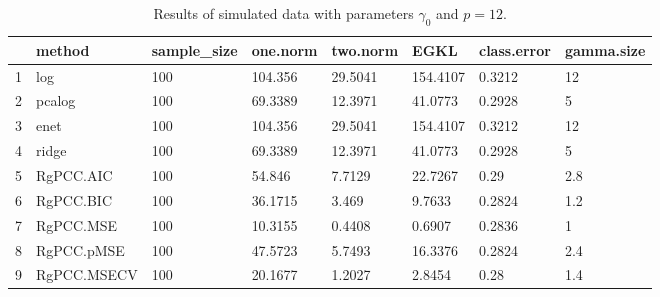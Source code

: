 \begin{table}[ht]
\centering
\begin{tabular}{rlllllll}
  \hline
 & method & sample\_size & one.norm & two.norm & EGKL & class.error & gamma.size \\ 
  \hline
1 & log & 100 & 104.356 & 29.5041 & 154.4107 & 0.3212 & 12 \\ 
  2 & pcalog & 100 & 69.3389 & 12.3971 & 41.0773 & 0.2928 & 5 \\ 
  3 & enet & 100 & 104.356 & 29.5041 & 154.4107 & 0.3212 & 12 \\ 
  4 & ridge & 100 & 69.3389 & 12.3971 & 41.0773 & 0.2928 & 5 \\ 
  5 & RgPCC.AIC & 100 & 54.846 & 7.7129 & 22.7267 & 0.29 & 2.8 \\ 
  6 & RgPCC.BIC & 100 & 36.1715 & 3.469 & 9.7633 & 0.2824 & 1.2 \\ 
  7 & RgPCC.MSE & 100 & 10.3155 & 0.4408 & 0.6907 & 0.2836 & 1 \\ 
  8 & RgPCC.pMSE & 100 & 47.5723 & 5.7493 & 16.3376 & 0.2824 & 2.4 \\ 
  9 & RgPCC.MSECV & 100 & 20.1677 & 1.2027 & 2.8454 & 0.28 & 1.4 \\ 
   \hline
\end{tabular}
\caption{Results of simulated data with parameters $\gamma_0$ and $p =12$. } 
\label{fig-0-debug-12-metrics-p}
\end{table}
